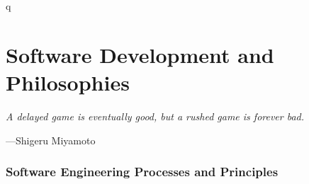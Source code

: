 q%


\part*{Software Development and Philosophies}

\vspace{4mm}
\begin{displayquote}
	\textit{A delayed game is eventually good, but a rushed game is forever bad.}
	\vspace{2mm}
	\begin{flushright}
		---Shigeru Miyamoto
	\end{flushright}
\end{displayquote}
\vspace{4mm}





\toclineskip
\section{Software Engineering Processes and Principles}


